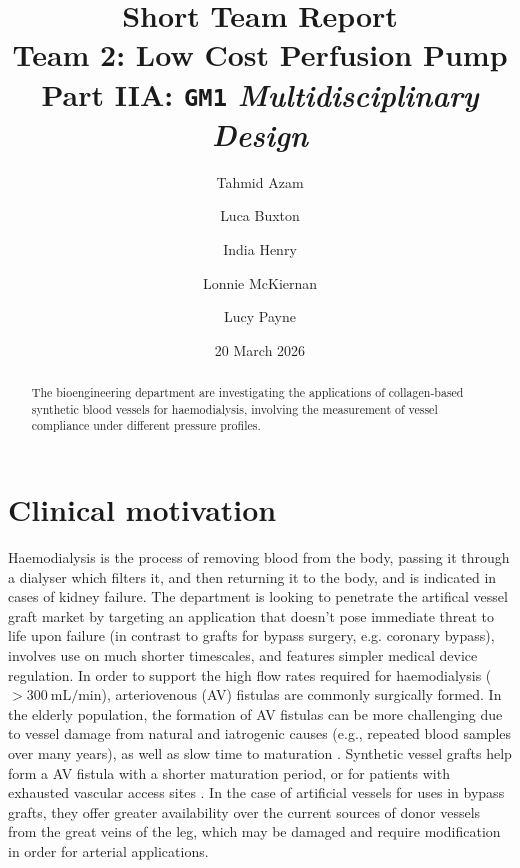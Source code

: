 \documentclass[10pt, a4paper]{article}
\title{
    Short Team Report\\[0.5em] 
    \Large Team 2: Low Cost Perfusion Pump\\[0.25em]  
    \normalsize Part IIA: \texttt{GM1} \textit{Multidisciplinary Design}
}
\author[1]{Tahmid Azam}
\author[1]{Luca Buxton}
\author[1]{India Henry}
\author[1]{Lonnie McKiernan}
\author[1]{Lucy Payne}
\affil[1]{Department of Engineering, University of Cambridge}
\date{20 March 2026}
\begin{document}
\maketitle

\begin{abstract}
    The bioengineering department are investigating the applications of collagen-based synthetic blood vessels for haemodialysis, involving the measurement of vessel compliance under different pressure profiles.


\end{abstract}

\section{Clinical motivation}

Haemodialysis is the process of removing blood from the body, passing it through a dialyser which filters it, and then returning it to the body, and is indicated in cases of kidney failure.
The department is looking to penetrate the artifical vessel graft market by targeting an application that doesn't pose immediate threat to life upon failure (in contrast to grafts for bypass surgery, e.g. coronary bypass), involves use on much shorter timescales, and features simpler medical device regulation.
In order to support the high flow rates required for haemodialysis ($>\SI{300}{\milli\liter\per\minute}$), arteriovenous (AV) fistulas are commonly surgically formed.
In the elderly population, the formation of AV fistulas can be more challenging due to vessel damage from natural and iatrogenic causes (e.g., repeated blood samples over many years), as well as slow time to maturation \supercite{mcgroganArteriovenousFistulaOutcomes2015}.
Synthetic vessel grafts help form a AV fistula with a shorter maturation period, or for patients with exhausted vascular access sites \supercite{akohProstheticArteriovenousGrafts2009}.
In the case of artificial vessels for uses in bypass grafts, they offer greater availability over the current sources of donor vessels from the great veins of the leg, which may be damaged and require modification in order for arterial applications.
\end{document}
